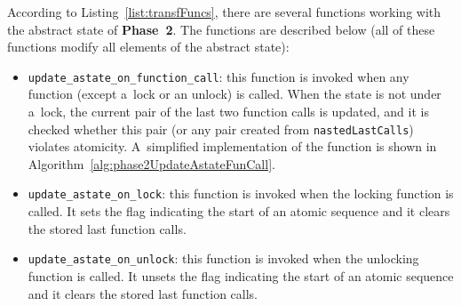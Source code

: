 \newpage
According to Listing~\ref{list:transfFuncs}, there are several functions
working with the abstract state of \textbf{Phase~2}. The functions are
described below (all of these functions modify all elements of the
abstract state):
\begin{itemize}
    \item
        \texttt{update\_astate\_on\_function\_call}: this function is
        invoked when any function (except a~lock or an unlock) is called.
        When the state is not under a~lock, the current pair of the last
        two function calls is updated, and it is checked whether this pair
        (or any pair created from \texttt{nastedLastCalls}) violates
        atomicity. A~simplified implementation of the function is shown in
        Algorithm~\ref{alg:phase2UpdateAstateFunCall}.

    \item
        \texttt{update\_astate\_on\_lock}: this function is invoked when
        the locking function is called. It sets the flag indicating the
        start of an atomic sequence and it clears the stored last function
        calls.

    \item
        \texttt{update\_astate\_on\_unlock}: this function is invoked when
        the unlocking function is called. It unsets the flag indicating the
        start of an atomic sequence and it clears the stored last function
        calls.
\end{itemize}

\begin{algorithm}[hbt]



    \caption{%
        A~simplified algorithm of updating the abstract state by the
        called function and a~check for atomicity violations
    }
    \label{alg:phase2UpdateAstateFunCall}
\end{algorithm}

